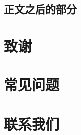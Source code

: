 \documentclass[bachelor,openright]{buaathesis}
\begin{document}
	\section{正文之后的部分}
	
\chapter{致谢}
\cleardoublepage
%

\appendix


\chapter{常见问题}

\chapter{联系我们}
\end{document}
